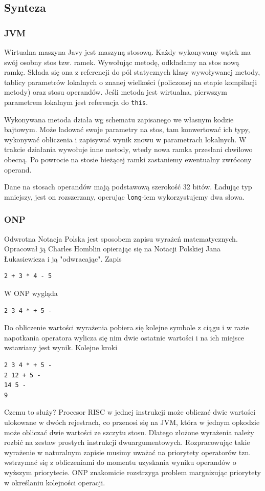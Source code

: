 \documentclass[a4paper,12pt]{article}
\begin{document}
\subsection{Synteza}
\subsubsection{JVM}
Wirtualna maszyna Javy jest maszyną stosową. Każdy wykonywany wątek ma swój osobny stos tzw. ramek. Wywołując metodę, odkładamy na stos nową ramkę. Składa się ona z referencji do pól statycznych klasy wywoływanej metody, tablicy parametrów lokalnych o znanej wielkości (policzonej na etapie kompilacji metody) oraz stosu operandów. Jeśli metoda jest wirtualna, pierwszym parametrem lokalnym jest referencja do \verb|this|.

Wykonywana metoda działa wg schematu zapisanego we własnym kodzie bajtowym. Może ładować swoje parametry na stos, tam konwertować ich typy, wykonywać obliczenia i zapisywać wynik znowu w parametrach lokalnych. W trakcie działania wywołuje inne metody, wtedy nowa ramka przesłani chwilowo obecną. Po powrocie na stosie bieżącej ramki zastaniemy ewentualny zwrócony operand.

Dane na stosach operandów mają podstawową szerokość 32 bitów. Ładując typ mniejszy, jest on rozszerzany, operując \verb|long|-iem wykorzystujemy dwa słowa.

\subsubsection{ONP}
Odwrotna Notacja Polska jest sposobem zapisu wyrażeń matematycznych. Opracował ją Charles Homblin opierając się na Notacji Polskiej Jana Łukasiewicza i ją "odwracając". Zapis
\begin{verbatim}
2 + 3 * 4 - 5
\end{verbatim}
W ONP wygląda
\begin{verbatim}
2 3 4 * + 5 -
\end{verbatim}
Do obliczenie wartości wyrażenia pobiera się kolejne symbole z ciągu i w razie napotkania operatora wylicza się nim dwie ostatnie wartości i na ich miejsce wstawiany jest wynik. Kolejne kroki
\begin{verbatim}
2 3 4 * + 5 -
2 12 + 5 -
14 5 -
9
\end{verbatim}
Czemu to służy? Procesor RISC w jednej instrukcji może obliczać dwie wartości ulokowane w dwóch rejestrach, co przenosi się na JVM, która w jednym opkodzie może obliczać dwie wartości ze szczytu stosu. Dlatego złożone wyrażenia należy rozbić na zestaw prostych instrukcji dwuargumentowych. Rozpracowując takie wyrażenie w naturalnym zapisie musimy uważać na priorytety operatorów tzn. wstrzymać się z obliczeniami do momentu uzyskania wyniku operandów o wyższym priorytecie. ONP znakomicie rozstrzyga problem margnizując priorytety w określaniu kolejności operacji.
\end{document}
